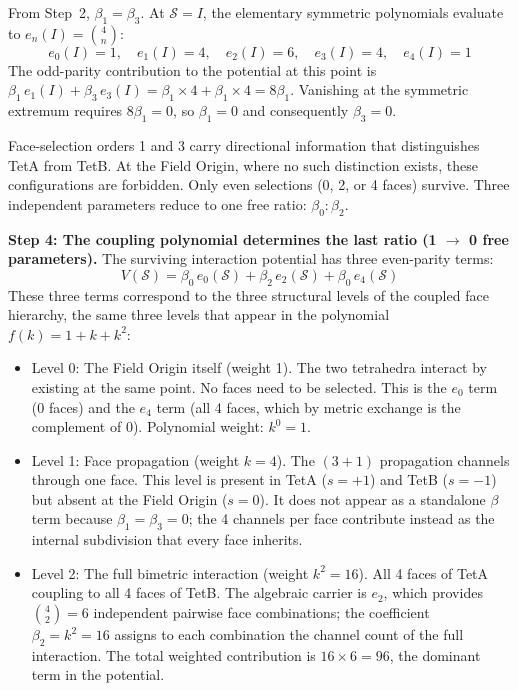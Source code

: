 \documentclass[aps,prd,preprint,superscriptaddress,showpacs,preprintnumbers,amsmath,amssymb,nofootinbib]{revtex4-2}
\begin{document}
From Step~2, $\beta_1 = \beta_3$. At $\mathcal{S} = I$, the elementary symmetric polynomials evaluate to $e_n(I) = \binom{4}{n}$:
\begin{equation}
e_0(I) = 1, \quad e_1(I) = 4, \quad e_2(I) = 6, \quad e_3(I) = 4, \quad e_4(I) = 1
\end{equation}
The odd-parity contribution to the potential at this point is $\beta_1\,e_1(I) + \beta_3\,e_3(I) = \beta_1 \times 4 + \beta_1 \times 4 = 8\beta_1$. Vanishing at the symmetric extremum requires $8\beta_1 = 0$, so $\beta_1 = 0$ and consequently $\beta_3 = 0$.

Face-selection orders 1 and 3 carry directional information that distinguishes TetA from TetB. At the Field Origin, where no such distinction exists, these configurations are forbidden. Only even selections (0, 2, or 4 faces) survive. Three independent parameters reduce to one free ratio: $\beta_0 : \beta_2$.

\textbf{Step 4: The coupling polynomial determines the last ratio (1 $\to$ 0 free parameters).} The surviving interaction potential has three even-parity terms:
\begin{equation}
V(\mathcal{S}) = \beta_0\,e_0(\mathcal{S}) + \beta_2\,e_2(\mathcal{S}) + \beta_0\,e_4(\mathcal{S})
\end{equation}
These three terms correspond to the three structural levels of the coupled face hierarchy, the same three levels that appear in the polynomial $f(k) = 1 + k + k^2$:
\begin{itemize}
\item Level 0: The Field Origin itself (weight 1). The two tetrahedra interact by existing at the same point. No faces need to be selected. This is the $e_0$ term (0 faces) and the $e_4$ term (all 4 faces, which by metric exchange is the complement of 0). Polynomial weight: $k^0 = 1$.
\item Level 1: Face propagation (weight $k = 4$). The $(3{+}1)$ propagation channels through one face. This level is present in TetA ($s = +1$) and TetB ($s = -1$) but absent at the Field Origin ($s = 0$). It does not appear as a standalone $\beta$ term because $\beta_1 = \beta_3 = 0$; the 4 channels per face contribute instead as the internal subdivision that every face inherits.
\item Level 2: The full bimetric interaction (weight $k^2 = 16$). All 4 faces of TetA coupling to all 4 faces of TetB. The algebraic carrier is $e_2$, which provides $\binom{4}{2} = 6$ independent pairwise face combinations; the coefficient $\beta_2 = k^2 = 16$ assigns to each combination the channel count of the full interaction. The total weighted contribution is $16 \times 6 = 96$, the dominant term in the potential.
\end{itemize}
\end{document}
